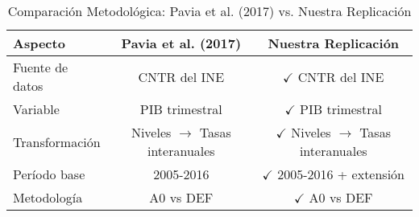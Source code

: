 \begin{table}[h]
\centering
\caption{Comparación Metodológica: Pavia et al. (2017) vs. Nuestra Replicación}
\label{tab:metodologia_comparacion}
\begin{tabular}{lcc}
\toprule
\textbf{Aspecto} & \textbf{Pavia et al. (2017)} & \textbf{Nuestra Replicación} \\
\midrule
Fuente de datos & CNTR del INE & $\checkmark$ CNTR del INE \\
Variable & PIB trimestral & $\checkmark$ PIB trimestral \\
Transformación & Niveles $\rightarrow$ Tasas interanuales & $\checkmark$ Niveles $\rightarrow$ Tasas interanuales \\
Período base & 2005-2016 & $\checkmark$ 2005-2016 + extensión \\
Metodología & A0 vs DEF & $\checkmark$ A0 vs DEF \\
\bottomrule
\end{tabular}
\end{table}